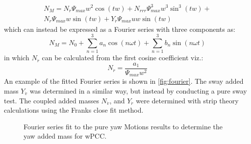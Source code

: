 \begin{equation}
    \begin{align}    
    N_{M} = N_{\dot{r}} \Psi_{max} w^{2} \cos{\left(t w \right)} + N_{rrr} \Psi_{max}^{3} w^{3} \sin^{3}{\left(t w \right)} + \\ 
    N_{r} \Psi_{max} w \sin{\left(t w \right)} + Y_{\dot{r}} \Psi_{max} u w \sin{\left(t w \right)}
    \end{align}
    \label{eq:MOTIONS_N_expanded}
\end{equation}
which can instead be expressed as a Fourier series with three components as:
\begin{equation}
    N_M = N_0 + \sum_{n=1}^3a_n \cos(n \omega t) + \sum_{n=1}^3b_n \sin(n \omega t) 
    \label{eq:fourier}
\end{equation}
in which $N_{\dot{r}}$ can be calculated from the first cosine coefficient viz.:
\begin{equation}
    N_{\dot{r}} = \frac{a_1}{\Psi_{max} w^{2}}
    \label{eq:N_r1d}
\end{equation}
An example of the fitted Fourier series is shown in \autoref{fig:fourier}. The sway added mass $Y_{\dot{v}}$ was determined in a similar way, but instead by conducting a pure sway test. The coupled added masses $N_{\dot{v}}$, and $Y_{\dot{r}}$ were determined with strip theory calculations using the Franks close fit method. 
\begin{figure}[h!]
    \centering   
    \caption{Fourier series fit to the pure yaw Motions results to determine the yaw added mass for wPCC.}
    \label{fig:fourier}
\end{figure}